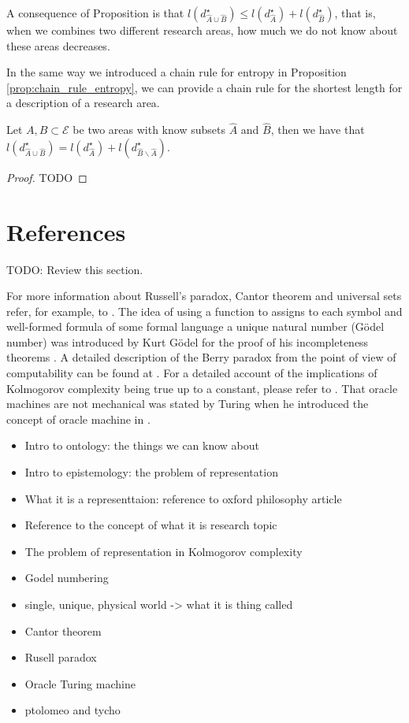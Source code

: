 A consequence of Proposition \label{prop:areas_union} is that $l \left( d_{\hat{A} \cup \hat{B}}^{\star} \right) \leq l \left( d_{\hat{A}}^{\star} \right) + l \left( d_{\hat{B}}^{\star} \right)$, that is, when we combines two different research areas, how much we do not know about these areas decreases.

In the same way we introduced a chain rule for entropy in Proposition \ref{prop:chain_rule_entropy}, we can provide a chain rule for the shortest length for a description of a research area.

\begin{proposition}
Let $A, B \subset \mathcal{E}$ be two areas with know subsets $\hat{A}$ and $\hat{B}$, then we have that $l \left( d_{\hat{A} \cup \hat{B}}^{\star} \right) = l \left( d_{\hat{A}}^{\star} \right) + l \left( d_{\hat{B} \backslash \hat{A}}^{\star} \right)$.
\end{proposition}
\begin{proof}
{\color{red} TODO}
\end{proof}

%
%

\section{References}

{\color{red} TODO: Review this section.}

For more information about Russell's paradox, Cantor theorem and universal sets refer, for example, to \cite{jech2013set}. The idea of using a function to assigns to each symbol and well-formed formula of some formal language a unique natural number (Gödel number) was introduced by Kurt Gödel for the proof of his incompleteness theorems \cite{godel1931formal}. A detailed description of the Berry paradox from the point of view of computability can be found at \cite{chaitin1995berry}. For a detailed account of the implications of Kolmogorov complexity being true up to a constant, please refer to \cite{li2013introduction}. That oracle machines are not mechanical was stated by Turing when he introduced the concept of oracle machine in \cite{turing1939systems}.

\begin{itemize}
\item Intro to ontology: the things we can know about
\item Intro to epistemology: the problem of representation
\item What it is a representtaion: reference to oxford philosophy article
\item Reference to the concept of what it is research topic
\item The problem of representation in Kolmogorov complexity
\item Godel numbering
\item single, unique, physical world -> what it is thing called
\item Cantor theorem
\item Rusell paradox
\item Oracle Turing machine
\item ptolomeo and tycho
\end{itemize}

